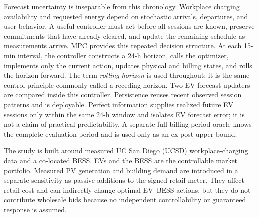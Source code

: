 \documentclass[final,5p,times]{elsarticle}
\begin{document}
Forecast uncertainty is inseparable from this chronology. Workplace charging availability and requested energy depend on stochastic arrivals, departures, and user behavior. A useful controller must act before all sessions are known, preserve commitments that have already cleared, and update the remaining schedule as measurements arrive. MPC provides this repeated decision structure. At each 15-min interval, the controller constructs a 24-h horizon, calls the optimizer, implements only the current action, updates physical and billing states, and rolls the horizon forward. The term \emph{rolling horizon} is used throughout; it is the same control principle commonly called a receding horizon. Two EV forecast updaters are compared inside this controller. Persistence reuses recent observed session patterns and is deployable. Perfect information supplies realized future EV sessions only within the same 24-h window and isolates EV forecast error; it is not a claim of practical predictability. A separate full billing-period oracle knows the complete evaluation period and is used only as an ex-post upper bound.

The study is built around measured UC San Diego (UCSD) workplace-charging data and a co-located BESS. EVs and the BESS are the controllable market portfolio. Measured PV generation and building demand are introduced in a separate sensitivity as passive additions to the signed retail meter. They affect retail cost and can indirectly change optimal EV--BESS actions, but they do not contribute wholesale bids because no independent controllability or guaranteed response is assumed.
\end{document}
